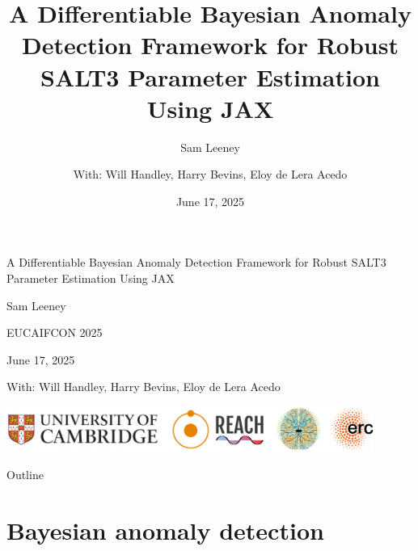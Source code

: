 \documentclass[aspectratio=169]{beamer}
\title{A Differentiable Bayesian Anomaly Detection Framework for Robust SALT3 Parameter Estimation Using JAX}
\subtitle{Sam Leeney}
\date{June 17, 2025}
\author{With: Will Handley, Harry Bevins, Eloy de Lera Acedo}
\institute{} %
\begin{document}
\begin{frame}
  \begin{center}
    {\LARGE A Differentiable Bayesian Anomaly Detection Framework for Robust SALT3 Parameter Estimation Using JAX\par}
    \vspace{0.5cm}

    {\large Sam Leeney\par}
    \vspace{0.5cm}

    {\normalsize EUCAIFCON 2025\par}
    {\normalsize June 17, 2025\par}
    \vspace{1cm}

    {\footnotesize With: Will Handley, Harry Bevins, Eloy de Lera Acedo\par}
    \vfill

    \includegraphics[width=0.9\textwidth]{images/affiliations.png}
  \end{center}
\end{frame}

\begin{frame}{Outline}
  \tableofcontents[hideallsubsections]
\end{frame}


\section{Bayesian anomaly detection}
\end{document}
